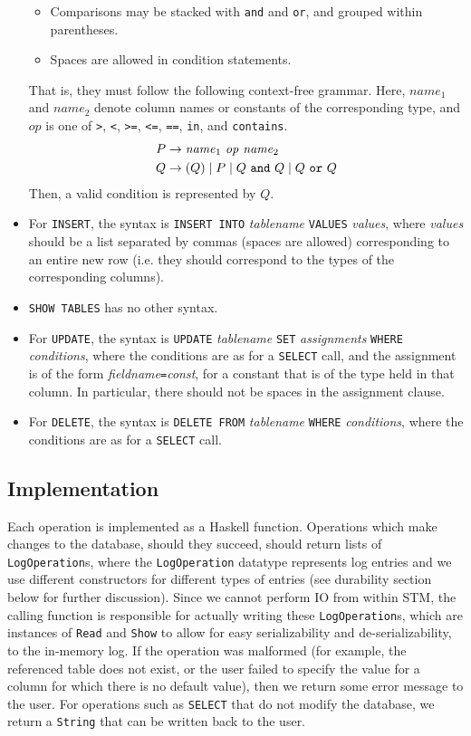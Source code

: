 \documentclass[10pt]{article}
\begin{document}
\begin{multicols}{2}
\begin{itemize}
\begin{itemize}
		\item Comparisons may be stacked with \verb+and+ and \verb+or+, and grouped within parentheses.
		\item Spaces are allowed in condition statements.
	\end{itemize}
	That is, they must follow the following context-free grammar. Here, $\mathit{name}_1$ and $\mathit{name}_2$ denote column names or constants of the corresponding type, and $\mathit{op}$ is one of \verb+>+, \verb+<+, \verb+>=+, \verb+<=+, \verb+==+, \verb+in+, and \verb+contains+.
	\begin{align*}
		P &\to \mathit{name}_1\ \mathit{op}\ \mathit{name}_2\\
		Q &\to (Q) \mid P \mid Q\text{ \texttt{and} } Q\mid Q\text{ \texttt{or} } Q
	\end{align*}
	Then, a valid condition is represented by $Q$.
	\item For \texttt{INSERT}, the syntax is \texttt{INSERT INTO} \textit{tablename} \texttt{VALUES} \textit{values}, where \textit{values} should be a list separated by commas (spaces are allowed) corresponding to an entire new row (i.e. they should correspond to the types of the corresponding columns).
	\item \texttt{SHOW TABLES} has no other syntax.
	\item For \texttt{UPDATE}, the syntax is \texttt{UPDATE} \textit{tablename} \texttt{SET} \textit{assignments} \texttt{WHERE} \textit{conditions}, where the conditions are as for a \verb+SELECT+ call, and the assignment is of the form \textit{fieldname}\verb+=+\textit{const}, for a constant that is of the type held in that column. In particular, there should not be spaces in the assignment clause.
	\item For \texttt{DELETE}, the syntax is \texttt{DELETE FROM} \textit{tablename} \texttt{WHERE} \textit{conditions}, where the conditions are as for a \verb+SELECT+ call.
\end{itemize}
\subsection{Implementation}
Each operation is implemented as a Haskell function.  Operations which make changes to the database, should they succeed, should return lists of \texttt{LogOperation}s, where the \texttt{LogOperation} datatype represents log entries and we use different constructors for different types of entries (see durability section below for further discussion). Since we cannot perform IO from within STM, the calling function is responsible for actually writing these \texttt{LogOperation}s, which are instances of \texttt{Read} and \texttt{Show} to allow for easy serializability and de-serializability, to the in-memory log. If the operation was malformed (for example, the referenced table does not exist, or the user failed to specify the value for a column for which there is no default value), then we return some error message to the user. For operations such as \texttt{SELECT} that do not modify the database, we return a \texttt{String} that can be written back to the user. 


\end{multicols}
\end{document}
